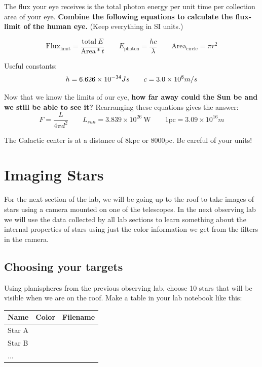 \documentclass[10pt]{article}%
\begin{document}
The flux your eye receives is the total photon energy per unit time per collection area of your eye.  \textbf{Combine the following equations to calculate the flux-limit of the human eye.} (Keep everything in SI units.)

\begin{equation}
\mathrm{Flux_{limit}} = \frac{\mathrm{total} \ E}{\mathrm{Area}*t}
\qquad
E_{\mathrm{photon}} = \frac{hc}{\lambda}
\qquad
\mathrm{Area}_{\mathrm{circle}} = \pi r^2
\end{equation}

Useful constants:
\begin{equation}
h = 6.626 \times 10^{-34} J \\ s
\qquad
c = 3.0 \times 10^8 m/s
\end{equation}

Now that we know the limits of our eye, \textbf{how far away could the Sun be and we still be able to see it?} Rearranging these equations gives the answer:
\begin{equation}
F = \frac{L}{4\pi d^2}
\qquad
L_{sun} = 3.839 \times 10^{26} \  \mathrm{W}
\qquad
1 \mathrm{pc} = 3.09 \times 10^{16} m
\end{equation}

The Galactic center is at a distance of 8kpc or 8000pc.  Be careful of your units!

\section{Imaging Stars}
For the next section of the lab, we will be going up to the roof to take images of stars using a camera mounted on one of the telescopes. In the next observing lab we will use the data collected by all lab sections to learn something about the internal properties of stars using just the color information we get from the filters in the camera.

\subsection{Choosing your targets}
Using planispheres from the previous observing lab, choose 10 stars that will be visible when we are on the roof. Make a table in your lab notebook like this:

\begin{center}
	\begin{tabular}{| p{3cm} | p{3cm} | p{5cm} |}
	\hline
	  \textbf{Name} & \textbf{Color} & \textbf{Filename} \\
	 \hline
	 \hline
	  Star A &  &  \\
	  \hline
	  Star B &  &  \\
	  \hline
	  ... &  & \\
	  \hline
	\end{tabular}
\end{center}
\end{document}

